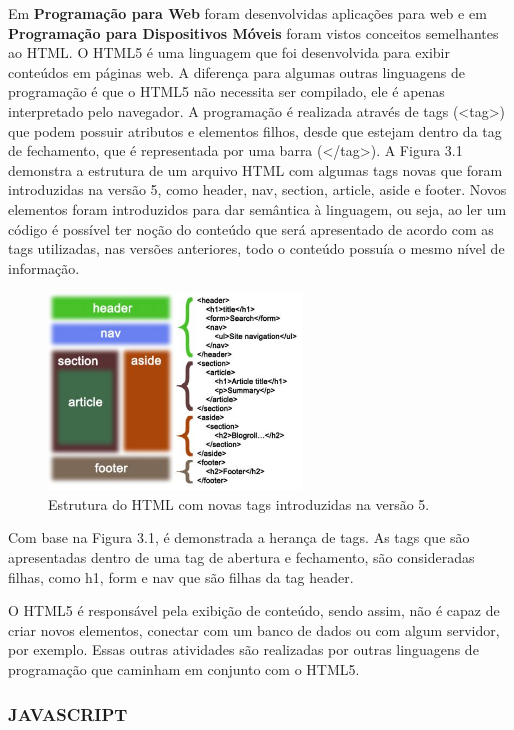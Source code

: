 \documentclass[
  12pt,				%
  openany,
  oneside,
  a4paper,			%
  english,			%
  brazil
]{article}
\numberwithin{figure}{section}
\numberwithin{table}{section}
\begin{document}
Em \textbf{Programação para Web} foram desenvolvidas aplicações para web e em \textbf{Programação para Dispositivos Móveis} foram vistos conceitos semelhantes ao HTML. O HTML5 é uma linguagem que foi desenvolvida para exibir conteúdos em páginas web. A diferença para algumas outras linguagens de programação é que o HTML5 não necessita ser compilado, ele é apenas interpretado pelo navegador. A programação é realizada através de tags (<tag>) que podem possuir atributos e elementos filhos, desde que estejam dentro da tag de fechamento, que é representada por uma barra (</tag>). A Figura 3.1 demonstra a estrutura de um arquivo HTML com algumas tags novas que foram introduzidas na versão 5, como header, nav, section, article, aside e footer. Novos elementos foram introduzidos para dar semântica à linguagem, ou seja, ao ler um código é possível ter noção do conteúdo que será apresentado de acordo com as tags utilizadas, nas versões anteriores, todo o conteúdo possuía o mesmo nível de informação.

\begin{figure}[!htb]
\centering
\includegraphics[width=0.6\textwidth]{figura31}
\caption{Estrutura do HTML com novas tags introduzidas na versão 5.}
\end{figure}

Com base na Figura 3.1, é demonstrada a herança de tags. As tags que são apresentadas dentro de uma tag de abertura e fechamento, são consideradas filhas, como h1, form e nav que são filhas da tag header.

O HTML5 é responsável pela exibição de conteúdo, sendo assim, não é capaz de criar novos elementos, conectar com um banco de dados ou com algum servidor, por exemplo. Essas outras atividades são realizadas por outras linguagens de programação que caminham em conjunto com o HTML5.



\subsubsection{JAVASCRIPT}
\end{document}
